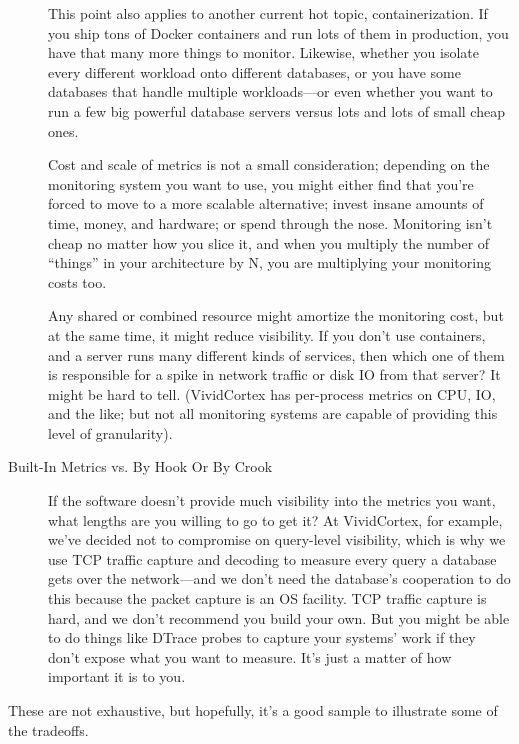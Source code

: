 \documentclass{vivid_layout}
\begin{document}
\begin{description}
This point also applies to another current hot topic, containerization. If you
ship tons of Docker containers and run lots of them in production, you have that
many more things to monitor. Likewise, whether you isolate every different
workload onto different databases, or you have some databases that handle
multiple workloads---or even whether you want to run a few big powerful database
servers versus lots and lots of small cheap ones.

Cost and scale of metrics is not a small consideration; depending on the monitoring system you want
to use, you might either find that you're forced to move to a more scalable
alternative; invest insane amounts of time, money, and hardware; or spend
through the nose. Monitoring isn't cheap no matter how you slice it, and when
you multiply the number of ``things'' in your architecture by N, you 
are multiplying your monitoring costs too.

Any shared or combined resource might amortize the monitoring cost, but
at the same time, it might reduce visibility. If you don't use containers, and a
server runs many different kinds of services, then which one of them is
responsible for a spike in network traffic or disk IO from that server? It might
be hard to tell. (VividCortex has per-process metrics on CPU, IO, and the like;
but not all monitoring systems are capable of providing this level of
granularity).

\item[Built-In Metrics vs. By Hook Or By Crook] If the software doesn't provide
much visibility into the metrics you want, what lengths are you willing
to go to get it? At VividCortex, for example, we've decided not to compromise on
query-level visibility, which is why we use TCP traffic capture and decoding to
measure every query a database gets over the network---and we don't need the
database's cooperation to do this because the packet capture is an OS facility.
TCP traffic capture is hard, and we don't recommend you build your own.
But you might be able to do things like DTrace probes to capture your systems'
work if they don't expose what you want to measure. It's just a matter of how
important it is to you.

\end{description}

These are not exhaustive, but hopefully, it's a good sample to illustrate some of
the tradeoffs.
\end{document}

